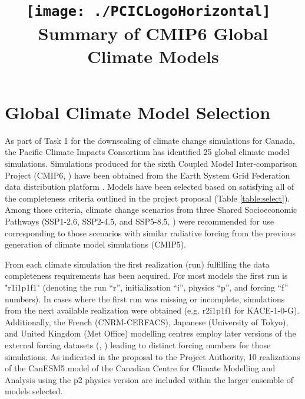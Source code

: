 \documentclass[]{scrartcl}
\title{\texttt{[image: ./PCICLogoHorizontal]}\vspace{50pt}~\\Summary of CMIP6 Global Climate Models}
\author{}
\begin{document}
\date{} %
\maketitle
\thispagestyle{empty}


\section{Global Climate Model Selection}
As part of Task 1 for the downscaling of climate change simulations for Canada, the Pacific Climate Impacts Consortium has identified 25 global climate model simulations. Simulations produced for the sixth Coupled Model Inter-comparison Project (CMIP6, \citealt{eyring_overview_2016}) have been obtained from the Earth System Grid Federation data distribution platform \citep{williams_earth_2009}. Models have been selected based on satisfying all of the completeness criteria outlined in the project proposal (Table \ref{table:select}). Among those criteria, climate change scenarios from three Shared Socioeconomic Pathways (SSP1-2.6, SSP2-4.5, and SSP5-8.5, \citealt{gidden_global_2019}) were recommended for use corresponding to those scenarios with similar radiative forcing from the previous generation of climate model simulations (CMIP5). 

From each climate simulation the first realization (run) fulfilling the data completeness requirements has been acquired. For most models the first run is "r1i1p1f1" (denoting the run ``r'', initialization ``i'', physics ``p'', and forcing ``f'' numbers). In cases where the first run was missing or incomplete, simulations from the next available realization were obtained (e.g. r2i1p1f1 for KACE-1-0-G). Additionally, the French (CNRM-CERFACS), Japanese (University of Tokyo), and United Kingdom (Met Office) modelling centres employ later versions of the external forcing datasets (\citealt{voldoire_evaluation_2019}, \citealt{Hajima2020}) leading to distinct forcing numbers for those simulations. As indicated in the proposal to the Project Authority, 10 realizations of the CanESM5 model of the Canadian Centre for Climate Modelling and Analysis using the p2 physics version \citep{swart_canadian_2019} are included within the larger ensemble of models selected. 
\end{document}
